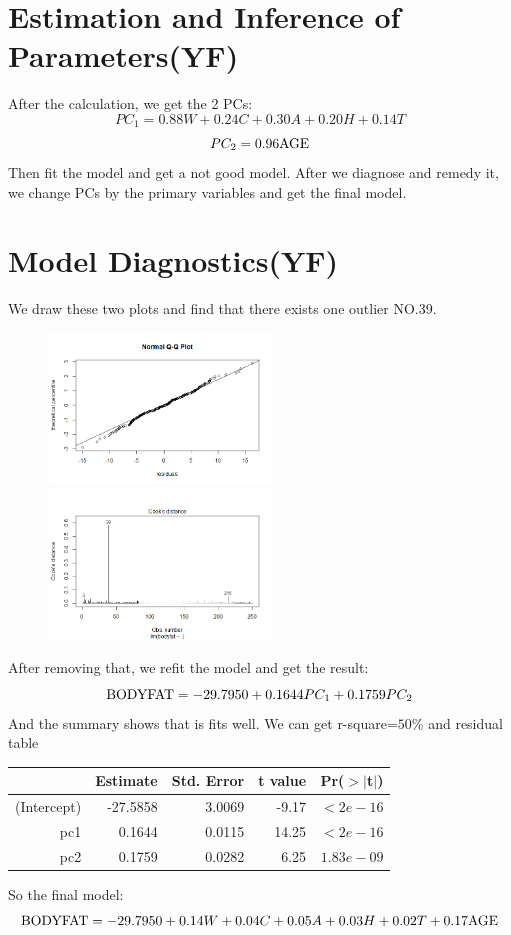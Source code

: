 \documentclass[12pt]{article}
\begin{document}
\section{\sffamily Estimation and Inference of Parameters(YF)}
After the calculation, we get the 2 PCs:
$$PC_1 = 0.88W + 0.24 C + 0.30
A + 0.20  H + 0.14 T$$
$$PC_2 = 0.96{\rm AGE} $$
Then fit the model and get a not good model. 
After we diagnose and remedy it, we change PCs by the primary variables and get the final model.
\section{\sffamily Model Diagnostics(YF)}
We draw these two plots and find that there exists one outlier NO.39.
\begin{figure}[ht]
	\centering
	\includegraphics[width=6cm,height=4cm]{2.png}
	\includegraphics[width=6cm,height=4cm]{3.png}  
\end{figure}
After removing that, we refit the model and get the result:
$${\rm BODYFAT} = -29.7950 + 0.1644PC_1 + 0.1759PC_2$$
And the summary shows that is fits well.
We can get r-square=$50\%$ and residual table
\begin{table}[ht]
    \centering
    \begin{tabular}{rrrrr}
      \hline
     & Estimate & Std. Error & t value & Pr($>$$|$t$|$) \\ 
      \hline
    (Intercept) & -27.5858 & 3.0069 & -9.17 & $<2e-16$ \\ 
      pc1 & 0.1644 & 0.0115 & 14.25 & $<2e-16$  \\ 
      pc2 & 0.1759 & 0.0282 & 6.25 & $1.83e-09$ \\ 
       \hline
    \end{tabular}
    \end{table}
So the final model: $${\rm BODYFAT} = -29.7950 + 0.14W + 0.04C + 0.05A+ 0.03H +0.02T + 0.17{\rm AGE}$$
\end{document}

